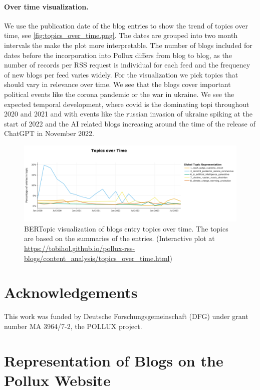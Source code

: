 \documentclass{article}
\begin{document}
\paragraph{Over time visualization.}
We use the publication date of the blog entries to show the trend of topics over time, see \autoref{fig:topics_over_time.png}. The dates are grouped into two month intervals the make the plot more interpretable. The number of blogs included for dates before the incorporation into Pollux differs from blog to blog, as the number of records per RSS request is individual for each feed and the frequency of new blogs per feed varies widely. For the visualization we pick topics that should vary in relevance over time. We see that the blogs cover important political events like the corona pandemic or the war in ukraine. We see the expected temporal development, where covid is the dominating topi throughout 2020 and 2021 and with events like the russian invasion of ukraine spiking at the start of 2022 and the AI related blogs increasing around the time of the release of ChatGPT in November 2022.

\begin{figure}[!htb]
    \includegraphics[width=1.0\textwidth]{figures/topics_over_time.png}
    \caption{BERTopic visualization of blogs entry topics over time. The topics are based on the summaries of the entries. (Interactive plot at \url{https://tobihol.github.io/pollux-rss-blogs/content_analysis/topics_over_time.html})}
    \label{fig:topics_over_time.png}
\end{figure}

\section*{Acknowledgements}
This work was funded by Deutsche Forschungsgemeinschaft (DFG) under grant number MA 3964/7-2, the POLLUX project.

\printbibliography

\appendix
\section{Representation of Blogs on the Pollux Website}\label{appendix:website}
\end{document}
